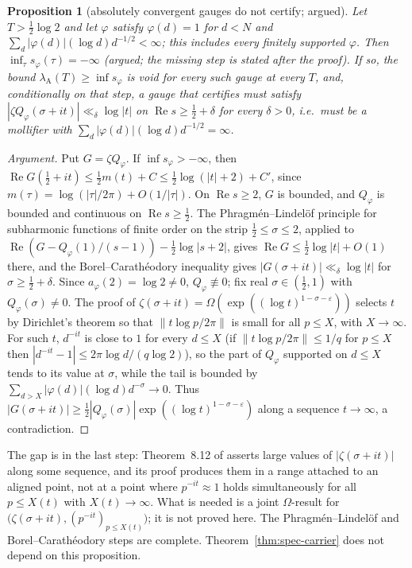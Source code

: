 \documentclass[11pt]{amsart}
\newtheorem{proposition}[theorem]{Proposition}
\theoremstyle{definition}
\theoremstyle{remark}
\newcommand{\Rel}{\operatorname{Re}}
\newcommand{\lamA}{\lambda_{\mathrm A}(T)}
\begin{document}
\begin{proposition}[absolutely convergent gauges do not certify; argued]\label{thm:spec-K2}
Let $T>\frac12\log2$ and let $\varphi$ satisfy $\varphi(d)=1$ for $d<N$ and $\sum_d|\varphi(d)|(\log d)d^{-1/2}<\infty$; this includes
every finitely supported $\varphi$. Then $\inf_\tau s_\varphi(\tau)=-\infty$ (argued; the missing step is stated after the proof). If so, the bound
$\lamA\ge\inf s_\varphi$ is void for every such gauge at every $T$, and, conditionally on that step, a gauge that certifies must satisfy $|\zeta Q_\varphi(\sigma+it)|\ll_\delta\log|t|$ on $\Rel s\ge\frac12+\delta$
for every $\delta>0$, i.e.\ must be a mollifier with $\sum_d|\varphi(d)|(\log d)d^{-1/2}=\infty$.
\end{proposition}
\begin{proof}[Argument]
Put $G=\zeta Q_\varphi$. If $\inf s_\varphi>-\infty$, then $\Rel G(\frac12+it)\le\frac12m(t)+C\le\frac12\log(|t|+2)+C'$, since $m(\tau)=\log(|\tau|/2\pi)+O(1/|\tau|)$.
On $\Rel s\ge2$, $G$ is bounded, and $Q_\varphi$ is bounded and continuous on $\Rel s\ge\frac12$. The Phragmén--Lindelöf principle for
subharmonic functions of finite order on the strip $\frac12\le\sigma\le2$, applied to $\Rel(G-Q_\varphi(1)/(s-1))-\frac12\log|s+2|$, gives
$\Rel G\le\frac12\log|t|+O(1)$ there, and the Borel--Carathéodory inequality gives $|G(\sigma+it)|\ll_\delta\log|t|$ for
$\sigma\ge\frac12+\delta$. Since $a_\varphi(2)=\log2\ne0$, $Q_\varphi\not\equiv0$; fix real $\sigma\in(\frac12,1)$ with $Q_\varphi(\sigma)\ne0$.
The proof of $\zeta(\sigma+it)=\Omega(\exp((\log t)^{1-\sigma-\varepsilon}))$ \cite[Thm.~8.12]{Titchmarsh1986} selects $t$ by Dirichlet's
theorem so that $\|t\log p/2\pi\|$ is small for all $p\le X$, with $X\to\infty$. For such $t$, $d^{-it}$ is close to $1$ for every $d\le X$
(if $\|t\log p/2\pi\|\le1/q$ for $p\le X$ then $|d^{-it}-1|\le2\pi\log d/(q\log2)$), so the part of $Q_\varphi$ supported on $d\le X$ tends to its value at $\sigma$, while the tail is bounded by
$\sum_{d>X}|\varphi(d)|(\log d)d^{-\sigma}\to0$. Thus $|G(\sigma+it)|\ge\frac12|Q_\varphi(\sigma)|\exp((\log t)^{1-\sigma-\varepsilon})$
along a sequence $t\to\infty$, a contradiction.
\end{proof}
The gap is in the last step: Theorem~8.12 of \cite{Titchmarsh1986} asserts large values of $|\zeta(\sigma+it)|$ along some sequence,
and its proof produces them in a range attached to an aligned point, not at a point where $p^{-it}\approx1$ holds simultaneously for all
$p\le X(t)$ with $X(t)\to\infty$. What is needed is a joint $\Omega$-result for $\big(\zeta(\sigma+it),(p^{-it})_{p\le X(t)}\big)$; it
is not proved here. The Phragmén--Lindelöf and Borel--Carathéodory steps are complete. Theorem~\ref{thm:spec-carrier} does not depend on
this proposition.
\end{document}
